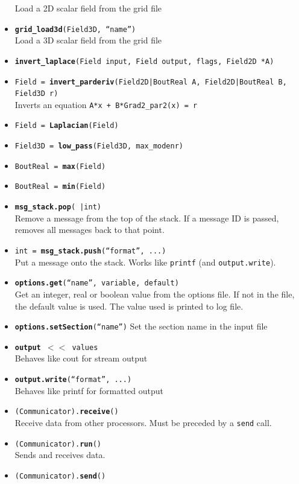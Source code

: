 \documentclass[12pt]{article}
\newcommand{\code}[1]{\texttt{#1}}
\begin{document}
\begin{itemize}
    Load a 2D scalar field from the grid file
  \item \texttt{{\bf grid\_load3d}(Field3D, ``name'')} \\
    Load a 3D scalar field from the grid file
  \item \texttt{{\bf invert\_laplace}(Field input, Field output, flags, Field2D *A)}
  \item \texttt{Field = {\bf invert\_parderiv}(Field2D|BoutReal A, Field2D|BoutReal B, Field3D r)} \\
    Inverts an equation  \code{A*x + B*Grad2\_par2(x) = r}
  \item \texttt{Field = {\bf Laplacian}(Field)}
  \item \texttt{Field3D = {\bf low\_pass}(Field3D, max\_modenr)}
  \item \texttt{BoutReal = {\bf max}(Field)}
  \item \texttt{BoutReal = {\bf min}(Field)}
  \item \texttt{{\bf msg\_stack.pop}( |int)} \\
    Remove a message from the top of the stack. If a message ID is passed,
    removes all messages back to that point.
  \item \texttt{int = {\bf msg\_stack.push}(``format'', ...)} \\
    Put a message onto the stack. Works like \code{printf} (and \code{output.write}).
  \item \texttt{{\bf options.get}(``name'', variable, default)} \\
    Get an integer, real or boolean value from the options file.
    If not in the file, the default value is used. The value
    used is printed to log file.
  \item \texttt{{\bf options.setSection}(``name'')}
    Set the section name in the input file
  \item \texttt{{\bf output} $< <$ values} \\
    Behaves like cout for stream output
  \item \texttt{{\bf output.write}(``format'', ...)}  \\
    Behaves like printf for formatted output
  \item \texttt{(Communicator).{\bf{receive}}()} \\
    Receive data from other processors. Must be preceded by a \code{send} call.
  \item \texttt{(Communicator).{\bf{run}}()} \\
    Sends and receives data.
  \item \texttt{(Communicator).{\bf{send}}()} \\

\end{itemize}
\end{document}
